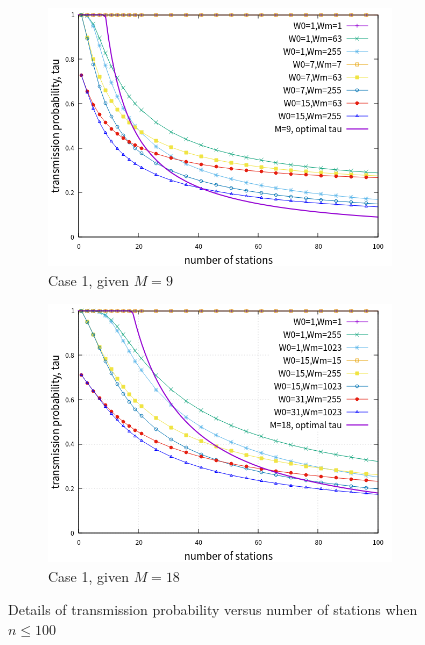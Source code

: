 \documentclass[journal]{IEEEtran}
\begin{document}
\begin{figure}[!t]
\centering
\begin{subfigure}{0.5\textwidth}
\centering
\includegraphics[scale=.54]{./figure/chp4/M9/n_tau_perf_M9_x100.png}
\caption{Case 1, given $M=9$}
\label{fig_tau_n_M9_detail}
\end{subfigure}

\begin{subfigure}{0.5\textwidth}
\centering
\includegraphics[scale=.54]{./figure/chp4/M18/n_tau_perf_M18_x100.png}
\caption{Case 1, given $M=18$}
\label{fig_tau_n_M18_detail}
\end{subfigure}

\caption{Details of transmission probability versus number of stations when $n\leq 100$}
\label{fig_tau_n_detail}
\end{figure}
\end{document}
